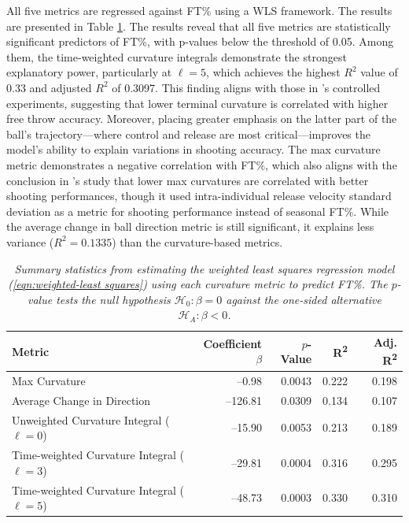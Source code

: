 \documentclass{article}
\begin{document}
    All five metrics are regressed against FT\% using a WLS framework. The results are presented in Table \ref{tab:wls-results}. The results reveal that all five metrics are statistically significant predictors of FT\%, with p-values below the threshold of 0.05. Among them, the time-weighted curvature integrals demonstrate the strongest explanatory power, particularly at $\ell = 5$, which achieves the highest $R^2$ value of 0.33 and adjusted $R^2$ of 0.3097. This finding aligns with those in \citet{slegers_role_2024}'s controlled experiments, suggesting that lower terminal curvature is correlated with higher free throw accuracy. Moreover, placing greater emphasis on the latter part of the ball’s trajectory—where control and release are most critical—improves the model's ability to explain variations in shooting accuracy. The max curvature metric demonstrates a negative correlation with FT\%, which also aligns with the conclusion in \citet{slegers_role_2024}'s study that lower max curvatures are correlated with better shooting performances, though it used intra-individual release velocity standard deviation as a metric for shooting performance instead of seasonal FT\%. While the average change in ball direction metric is still significant, it explains less variance ($R^2=0.1335$) than the curvature-based metrics.  
    
    \begin{table}[H]
        \centering
        \begin{tabular}{lrrrr}
        \toprule
        \textbf{Metric} & \textbf{Coefficient} $\beta$ & $p$-\textbf{Value} & \textbf{R\textsuperscript{2}} & \textbf{Adj. R\textsuperscript{2}} \\
        \midrule
        Max Curvature                               &   --0.98  & 0.0043  & 0.222  & 0.198 \\
        Average Change in Direction                 & --126.81  & 0.0309  & 0.134  & 0.107 \\
        Unweighted Curvature Integral ($\ell=0$)    &  --15.90  & 0.0053  & 0.213  & 0.189 \\
        Time-weighted Curvature Integral ($\ell=3$) &  --29.81  & 0.0004  & 0.316  & 0.295 \\
        Time-weighted Curvature Integral ($\ell=5$) &  --48.73  & 0.0003  & 0.330  & 0.310 \\
        \bottomrule
        \end{tabular}
        \caption{\it Summary statistics from estimating the weighted least squares regression model (\ref{eqn:weighted-least squares}) using each curvature metric to predict FT\%. The $p$-value tests the null hypothesis $\mathcal{H}_0 : \beta = 0$ against the one-sided alternative $\mathcal{H}_A : \beta < 0$.}
        \label{tab:wls-results}
    \end{table}
\end{document}
